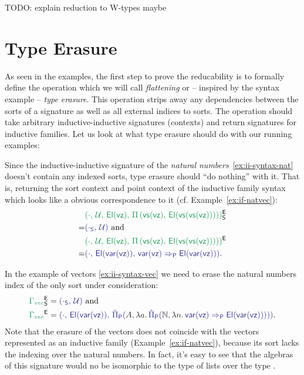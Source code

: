 TODO: explain reduction to W-types maybe

\section{Type Erasure}

As seen in the examples, the first step to prove the reducability is to formally
define the operation which we will call \emph{flattening} or -- inspired by
the syntax example -- \emph{type erasure}.
This operation strips away any dependencies between the sorts of a signature
as well as all external indices to sorts.
The operation should take arbitrary inductive-inductive signatures (contexts) and
return signatures for inductive families.
Let us look at what type erasure should do with our running examples:

\begin{example}\label{ex:red-e-nat}
Since the inductive-inductive signature of the \emph{natural numbers}~\ref{ex:ii-syntax-nat} doesn't
contain any indexed sorts, type erasure should ``do nothing'' with it.
That is, returning the sort context and point context of the inductive family
syntax which looks like a obvious correspondence to it (cf. Example~\ref{ex:if-natvec}):
\begin{align*}
  &\grm{(\cdot,\, \UU,\, \El(\vz),\, \Pi\left(\vs(\vz),\, \El(\vs(\vs(\vz)))\right))}^\EE_\Sc \\
= &\tqm{(\cdot_\Sc,\, \UU)} \text{ and} \\
  &\grm{(\cdot,\, \UU,\, \El(\vz),\, \Pi\left(\vs(\vz),\, \El(\vs(\vs(\vz)))\right))}^\EE \\
= &\tqm{(\cdot,\, \El(\var(\vz)),\, \var(\vz) \Rightarrow_\Pc \El(\var(\vz)))} \text{.}
\end{align*}
\end{example}

\begin{example}[Vectors]
In the example of vectors \ref{ex:ii-syntax-vec} we need to erase the natural numbers
index of the only sort under consideration:
\begin{align*}
\grm{\Gamma_{vec}}^\EE_\Sc
 &= \tqm{(\cdot_\Sc,\, \UU)} \text{ and} \\
\grm{\Gamma_{vec}}^\EE
  &= \tqm{(\cdot,\, \El(\var(\vz)),\, 
    \ExtPiP{A}{\blm{\lambda a.\,}\ExtPiP{\N}{\blm{\lambda n.\,}
    \var(\vz) \Rightarrow_\Pc \El(\var(\vz))}})} \text{.}
\end{align*}
Note that the erasure of the vectors does not coincide with the vectors represented
as an inductive family (Example~\ref{ex:if-natvec}), because its sort lacks the
indexing over the natural numbers.
In fact, it's easy to see that the algebras of this signature would no be isomorphic
to the type of lists over the type .
\end{example}

